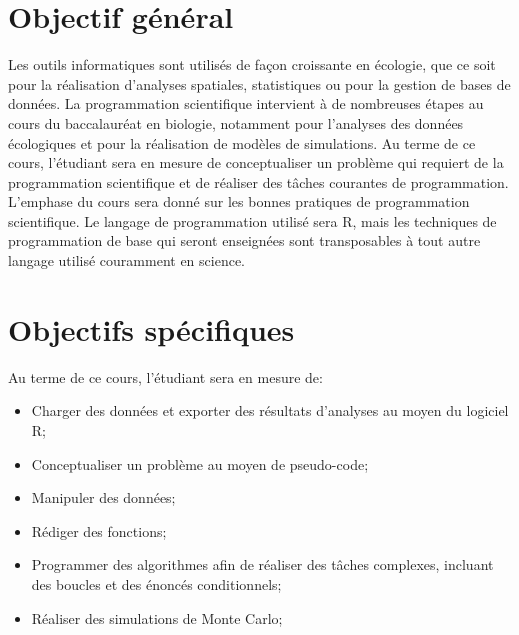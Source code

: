 \documentclass[12]{article}
\begin{document}
	\section*{Objectif général}

	Les outils informatiques sont utilisés de façon croissante en écologie,
	que ce soit pour la réalisation d'analyses spatiales, statistiques ou pour
	la gestion de bases de données. La programmation scientifique intervient à
	de nombreuses étapes au cours du baccalauréat en biologie, notamment pour
	l'analyses des données écologiques et pour la réalisation de modèles
	de simulations. Au terme de ce cours, l'étudiant sera en mesure de
	conceptualiser un problème qui requiert de la programmation scientifique
	et de réaliser des tâches courantes de programmation. L'emphase du cours
	sera donné sur les bonnes pratiques de programmation scientifique. Le
	langage de programmation utilisé sera R, mais les techniques de
	programmation de base qui seront enseignées sont transposables à tout
	autre langage utilisé couramment en science.

	\section*{Objectifs spécifiques}

	Au terme de ce cours, l'étudiant sera en mesure de:

	\begin{itemize}
	\renewcommand{\labelitemi}{$\bullet$}

	\item Charger des données et exporter des résultats d'analyses au moyen du
	logiciel R;

	\item Conceptualiser un problème au moyen de pseudo-code;

	\item Manipuler des données;

	\item Rédiger des fonctions;

    \item Programmer des algorithmes afin de réaliser des tâches complexes,
	incluant des boucles et des énoncés conditionnels;

	\item Réaliser des simulations de Monte Carlo;

	\end{itemize}

\end{document}
